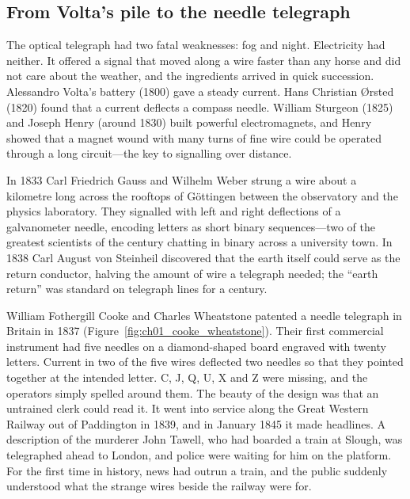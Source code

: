 \subsection{From Volta's pile to the needle telegraph}

The optical telegraph had two fatal weaknesses: fog and night. Electricity had neither. It offered a
signal that moved along a wire faster than any horse and did not care about the weather, and the
ingredients arrived in quick succession. Alessandro Volta's battery (1800) gave a steady current.
Hans Christian \O rsted (1820) found that a current deflects a compass needle. William Sturgeon
(1825) and Joseph Henry (around 1830) built powerful electromagnets, and Henry showed that a magnet
wound with many turns of fine wire could be operated through a long circuit---the key to signalling
over distance.

In 1833 Carl Friedrich Gauss and Wilhelm Weber strung a wire about a kilometre long across the
rooftops of G\"ottingen between the observatory and the physics laboratory. They signalled with left
and right deflections of a galvanometer needle, encoding letters as short binary sequences---two of
the greatest scientists of the century chatting in binary across a university town. In 1838 Carl
August von Steinheil discovered that the earth itself could serve as the return conductor, halving
the amount of wire a telegraph needed; the ``earth return'' was standard on telegraph lines for a
century.

William Fothergill Cooke and Charles Wheatstone patented a needle telegraph in Britain in 1837
(Figure~\ref{fig:ch01_cooke_wheatstone}). Their first commercial instrument had five needles on a
diamond-shaped board engraved with twenty letters. Current in two of the five wires deflected two
needles so that they pointed together at the intended letter. C, J, Q, U, X and Z were missing, and
the operators simply spelled around them. The beauty of the design was that an untrained clerk could
read it. It went into service along the Great Western Railway out of Paddington in 1839, and in
January 1845 it made headlines. A description of the murderer John Tawell, who had boarded a train
at Slough, was telegraphed ahead to London, and police were waiting for him on the platform. For the
first time in history, news had outrun a train, and the public suddenly understood what the strange
wires beside the railway were for.

